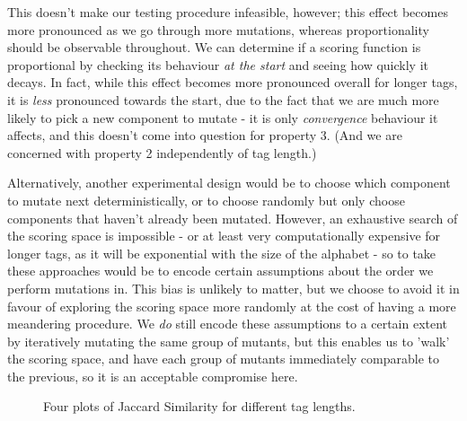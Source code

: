 \documentclass{l4proj}
\begin{document}
This doesn't make our testing procedure infeasible, however; this effect becomes more pronounced as we go through more mutations, whereas proportionality should be observable throughout. We can determine if a scoring function is proportional by checking its behaviour \textit{at the start} and seeing how quickly it decays. In fact, while this effect becomes more pronounced overall for longer tags, it is \textit{less} pronounced towards the start, due to the fact that we are much more likely to pick a new component to mutate - it is only \textit{convergence} behaviour it affects, and this doesn't come into question for property 3. (And we are concerned with property 2 independently of tag length.)

Alternatively, another experimental design would be to choose which component to mutate next deterministically, or to choose randomly but only choose components that haven't already been mutated. However, an exhaustive search of the scoring space is impossible - or at least very computationally expensive for longer tags, as it will be exponential with the size of the alphabet - so to take these approaches would be to encode certain assumptions about the order we perform mutations in. This bias is unlikely to matter, but we choose to avoid it in favour of exploring the scoring space more randomly at the cost of having a more meandering procedure. We \textit{do} still encode these assumptions to a certain extent by iteratively mutating the same group of mutants, but this enables us to 'walk' the scoring space, and have each group of mutants immediately comparable to the previous, so it is an acceptable compromise here.

\begin{figure} \label{fig:jaccards}
    \centering

    \caption{Four plots of Jaccard Similarity for different tag lengths.}

    \label{fig:jaccards}
\end{figure}
\end{document}
